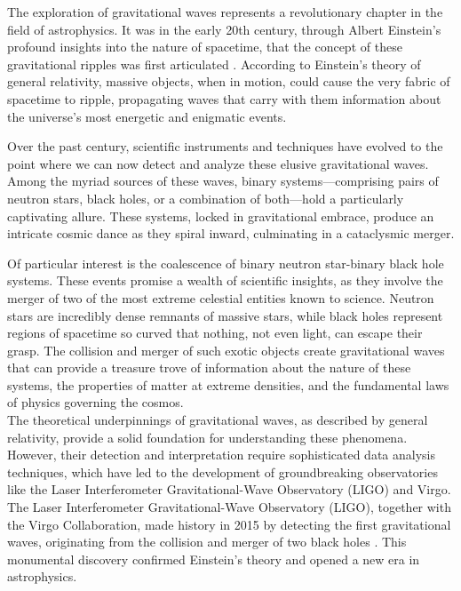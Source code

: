 The exploration of gravitational waves represents a revolutionary chapter in the field of astrophysics. It was in the early 20th century, through Albert Einstein's profound insights into the nature of spacetime, that the concept of these gravitational ripples was first articulated \cite{einstein1916naherungsweise}. According to Einstein's theory of general relativity, massive objects, when in motion, could cause the very fabric of spacetime to ripple, propagating waves that carry with them information about the universe's most energetic and enigmatic events.
\vspace{0.3cm}

Over the past century, scientific instruments and techniques have evolved to the point where we can now detect and analyze these elusive gravitational waves. Among the myriad sources of these waves, binary systems—comprising pairs of neutron stars, black holes, or a combination of both—hold a particularly captivating allure. These systems, locked in gravitational embrace, produce an intricate cosmic dance as they spiral inward, culminating in a cataclysmic merger.
\vspace{0.3cm}

Of particular interest is the coalescence of binary neutron star-binary black hole systems. These events promise a wealth of scientific insights, as they involve the merger of two of the most extreme celestial entities known to science. Neutron stars are incredibly dense remnants of massive stars, while black holes represent regions of spacetime so curved that nothing, not even light, can escape their grasp. The collision and merger of such exotic objects create gravitational waves that can provide a treasure trove of information about the nature of these systems, the properties of matter at extreme densities, and the fundamental laws of physics governing the cosmos.\\
The theoretical underpinnings of gravitational waves, as described by general relativity, provide a solid foundation for understanding these phenomena. However, their detection and interpretation require sophisticated data analysis techniques, which have led to the development of groundbreaking observatories like the Laser Interferometer Gravitational-Wave Observatory (LIGO) and Virgo. The Laser Interferometer Gravitational-Wave Observatory (LIGO), together with the Virgo Collaboration, made history in 2015 by detecting the first gravitational waves, originating from the collision and merger of two black holes \cite{abbott2016observation}. This monumental discovery confirmed Einstein's theory and opened a new era in astrophysics.
